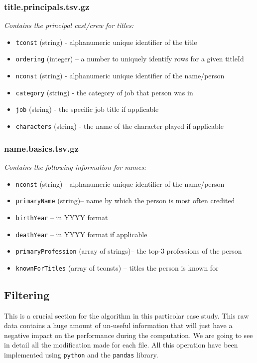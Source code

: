 \subsubsection*{title.principals.tsv.gz}
\emph{Contains the principal cast/crew for titles:}
\begin{itemize}
    \item \texttt{tconst} (string) - alphanumeric unique identifier of the title
    \item \texttt{ordering} (integer) – a number to uniquely identify rows for a given titleId
    \item \texttt{nconst} (string) - alphanumeric unique identifier of the name/person
    \item \texttt{category} (string) - the category of job that person was in
    \item \texttt{job} (string) - the specific job title if applicable
    \item \texttt{characters} (string) - the name of the character played if applicable
\end{itemize}

\subsubsection*{name.basics.tsv.gz}
\emph{Contains the following information for names:}
\begin{itemize}
    \item \texttt{nconst} (string) - alphanumeric unique identifier of the name/person
    \item \texttt{primaryName} (string)– name by which the person is most often credited
    \item \texttt{birthYear} – in YYYY format
    \item \texttt{deathYear} – in YYYY format if applicable
    \item \texttt{primaryProfession} (array of strings)– the top-3 professions of the person
    \item \texttt{knownForTitles} (array of tconsts) – titles the person is known for
\end{itemize}

\newpage
\subsection{Filtering}

This is a crucial section for the algorithm in this particolar case study. This raw data contains a huge amount of un-useful information that will just have a negative impact on the performance during the computation. We are going to see in detail all the modification made for each file. All this operation have been implemented using \texttt{python} and the \texttt{pandas} library.


